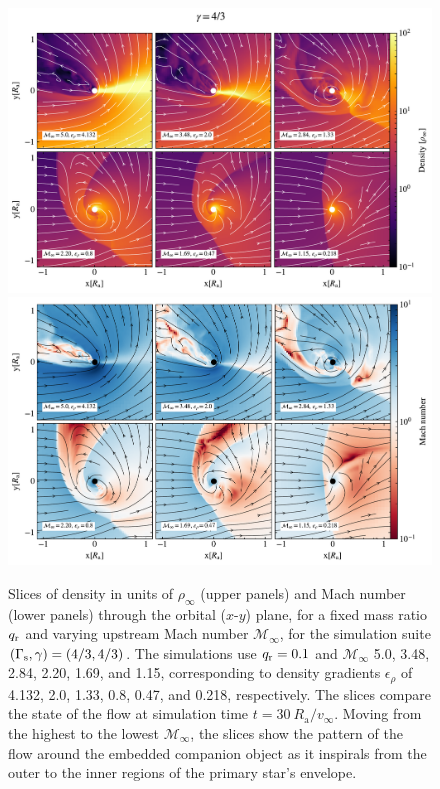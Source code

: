 \begin{figure}[t]%
\centering
\includegraphics[width=13.8cm]{figures/common_envelope/sliceplot_gamma_43_q0pt1_varymach_gradient_comparison_figure_z.pdf}
\includegraphics[width=13.8cm]{figures/common_envelope/sliceplot_gamma_43_q0pt1_varymach_mach_gradient_comparison_figure_z.pdf}
\caption{Slices of density in units of $\rho_\infty$ (upper panels) and Mach number (lower panels) through the orbital ($x$-$y$) plane, for a fixed mass ratio $q_{\rm r}$ and varying upstream Mach number $\mathcal{M}_\infty$, for the simulation suite $(\Gamma_{\rm s}, \gamma) = (4/3, 4/3)$. The simulations use $q_{\rm r} = 0.1$ and $\mathcal{M}_\infty$ 5.0, 3.48, 2.84, 2.20, 1.69, and 1.15, corresponding to density gradients $\epsilon_\rho$ of 4.132, 2.0, 1.33, 0.8, 0.47, and 0.218, respectively. The slices compare the state of the flow at simulation time $t = 30~R_{\mathrm{a}}/v_\infty$. Moving from the highest to the lowest $\mathcal{M}_\infty$, the slices show the pattern of the flow around the embedded companion object as it inspirals from the outer to the inner regions of the primary star's envelope.  
\label{fig:sims_g43_fix_q_vary_mach}}
\end{figure}

